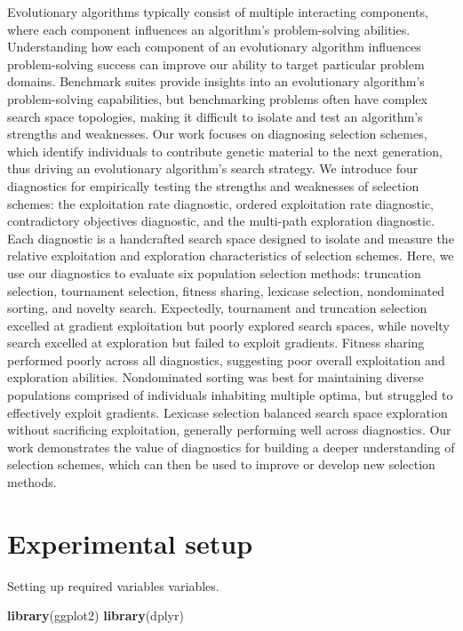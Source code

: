 \documentclass[]{book}
\newenvironment{Shaded}{\begin{snugshade}}{\end{snugshade}}
\newcommand{\KeywordTok}[1]{\textcolor[rgb]{0.13,0.29,0.53}{\textbf{#1}}}
\newcommand{\NormalTok}[1]{#1}
\begin{document}
Evolutionary algorithms typically consist of multiple interacting components, where each component influences an algorithm's problem-solving abilities.
Understanding how each component of an evolutionary algorithm influences problem-solving success can improve our ability to target particular problem domains.
Benchmark suites provide insights into an evolutionary algorithm's problem-solving capabilities, but benchmarking problems often have complex search space topologies, making it difficult to isolate and test an algorithm's strengths and weaknesses.
Our work focuses on diagnosing selection schemes, which identify individuals to contribute genetic material to the next generation, thus driving an evolutionary algorithm's search strategy.
We introduce four diagnostics for empirically testing the strengths and weaknesses of selection schemes: the exploitation rate diagnostic, ordered exploitation rate diagnostic, contradictory objectives diagnostic, and the multi-path exploration diagnostic.
Each diagnostic is a handcrafted search space designed to isolate and measure the relative exploitation and exploration characteristics of selection schemes.
Here, we use our diagnostics to evaluate six population selection methods: truncation selection, tournament selection, fitness sharing, lexicase selection, nondominated sorting, and novelty search.
Expectedly, tournament and truncation selection excelled at gradient exploitation but poorly explored search spaces, while novelty search excelled at exploration but failed to exploit gradients.
Fitness sharing performed poorly across all diagnostics, suggesting poor overall exploitation and exploration abilities.
Nondominated sorting was best for maintaining diverse populations comprised of individuals inhabiting multiple optima, but struggled to effectively exploit gradients.
Lexicase selection balanced search space exploration without sacrificing exploitation, generally performing well across diagnostics.
Our work demonstrates the value of diagnostics for building a deeper understanding of selection schemes, which can then be used to improve or develop new selection methods.

\hypertarget{experimental-setup}{%
\section{Experimental setup}\label{experimental-setup}}

Setting up required variables variables.

\begin{Shaded}
\begin{Highlighting}[]
\KeywordTok{library}\NormalTok{(ggplot2)}
\KeywordTok{library}\NormalTok{(dplyr)}
\end{Highlighting}
\end{Shaded}
\end{document}
